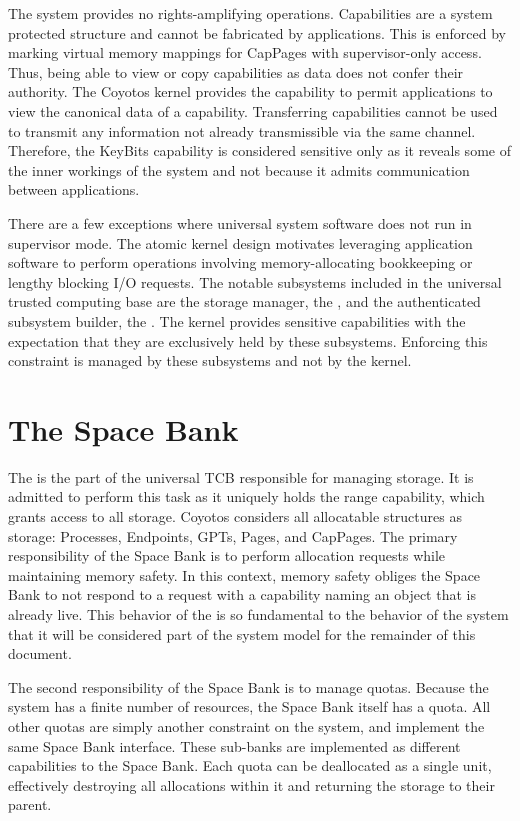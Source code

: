 The system provides no rights-amplifying operations.
Capabilities are a system protected structure and cannot be fabricated by applications.
This is enforced by marking virtual memory mappings for CapPages with supervisor-only access.
Thus, being able to view or copy capabilities as data does not confer their authority.
The Coyotos kernel provides the  capability to permit applications to view the canonical data of a capability.
Transferring capabilities cannot be used to transmit any information not already transmissible via the same channel.
Therefore, the KeyBits capability is considered sensitive only as it reveals some of the inner workings of the system and not because it admits communication between applications.

There are a few exceptions where universal system software does not run in supervisor mode.
The atomic kernel design motivates leveraging application software to perform operations involving memory-allocating bookkeeping or lengthy blocking I/O requests.
The notable subsystems included in the universal trusted computing base are the storage manager, the ,  and the authenticated subsystem builder, the .
The kernel provides sensitive capabilities with the expectation that they are exclusively held by these subsystems.
Enforcing this constraint is managed by these subsystems and not by the kernel.

\section{The Space Bank}
\label{sect:constructor:spacebank}

The  is the part of the universal TCB responsible for managing storage.
It is admitted to perform this task as it uniquely holds the range capability, which grants access to all storage.
Coyotos considers all allocatable structures as storage: Processes, Endpoints, GPTs, Pages, and CapPages.
The primary responsibility of the Space Bank is to perform allocation requests while maintaining memory safety.
In this context, memory safety obliges the Space Bank to not respond to a request with a capability naming an object that is already live.
This behavior of the  is so fundamental to the behavior of the system that it will be considered part of the system model for the remainder of this document.

The second responsibility of the Space Bank is to manage quotas.
Because the system has a finite number of resources, the Space Bank itself has a quota.
All other quotas are simply another constraint on the system, and implement the same Space Bank interface.
These sub-banks are implemented as different capabilities to the Space Bank.
Each quota can be deallocated as a single unit, effectively destroying all allocations within it and returning the storage to their parent.

